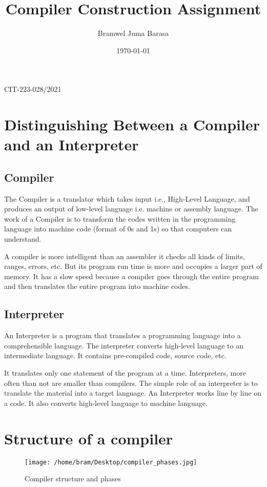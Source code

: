\documentclass{article}
\title{Compiler Construction Assignment}
\author{Bramwel Juma Barasa}
\date{\today}
\begin{document}
\maketitle

\thispagestyle{empty} %

\begin{center}
\Large CIT-223-028/2021%
\end{center}
\section{Distinguishing Between a Compiler and an Interpreter}
\subsection{Compiler}
\noindent The Compiler is a translator which takes input i.e., High-Level Language, and produces an output of low-level language i.e. machine or assembly language. The work of a Compiler is to transform the codes written in the programming language into machine code (format of 0s and 1s) so that computers can understand.

A compiler is more intelligent than an assembler it checks all kinds of limits, ranges, errors, etc.
But its program run time is more and occupies a larger part of memory. It has a slow speed because a compiler goes through the entire program and then translates the entire program into machine codes.
\subsection{Interpreter}
\noindent An Interpreter is a program that translates a programming language into a comprehensible language. The interpreter converts high-level language to an intermediate language. It contains pre-compiled code, source code, etc.

It translates only one statement of the program at a time.
Interpreters, more often than not are smaller than compilers. The simple role of an interpreter is to translate the material into a target language. An Interpreter works line by line on a code. It also converts high-level language to machine language.
\section{Structure of a compiler}
\vspace{0.2cm}
\begin{figure}
\texttt{[image: /home/bram/Desktop/compiler\_phases.jpg]}
\caption{Compiler structure and phases}
\label{compiler structure}

\end{figure}
\clearpage
\end{document}
